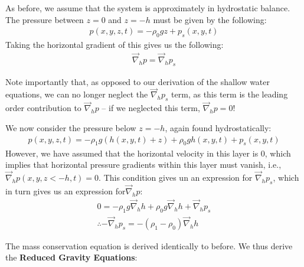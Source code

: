 As before, we assume that the system is approximately in hydrostatic balance. The pressure between $z=0$ and $z=-h$ must be given by the following:
\begin{align*}
    p(x,y,z,t)= -\rho_0 g z + p_s(x,y,t)
\end{align*}
Taking the horizontal gradient of this gives us the following:
\begin{align*}
    \vec{\nabla}_h p = \vec{\nabla}_h p_s
\end{align*}

Note importantly that, as opposed to our derivation of the shallow water equations, we can no longer neglect the $\vec{\nabla}_h p_s$ term, as this term is the leading order contribution to $\vec{\nabla}_h p$ – if we neglected this term, $\vec{\nabla}_h p=0$!

We now consider the pressure below $z=-h$, again found hydrostatically:
\begin{align*}
    p(x,y,z,t) = -\rho_1 g ( h(x,y,t) + z) + \rho_0 g h(x,y,t) + p_s(x,y,t)
\end{align*}
However, we have assumed that the horizontal velocity in this layer is $0$, which implies that horizontal pressure gradients within this layer must vanish, i.e., $\vec{\nabla}_h p(x,y,z<-h,t)=0$. This condition gives un an expression for $\vec{\nabla}_h p_s$, which in turn gives us an expression for$ \vec{\nabla}_h p$:
\begin{align*}
    0 = -\rho_1 g \vec{\nabla}_h h + \rho_0 g \vec{\nabla}_h h + \vec{\nabla}_h p_s
    \\
    \therefore - \vec{\nabla}_h p_s = - (\rho_1 - \rho_0)\vec{\nabla}_h h
\end{align*}

The mass conservation equation is derived identically to before. We thus derive the \textbf{Reduced Gravity Equations}:

